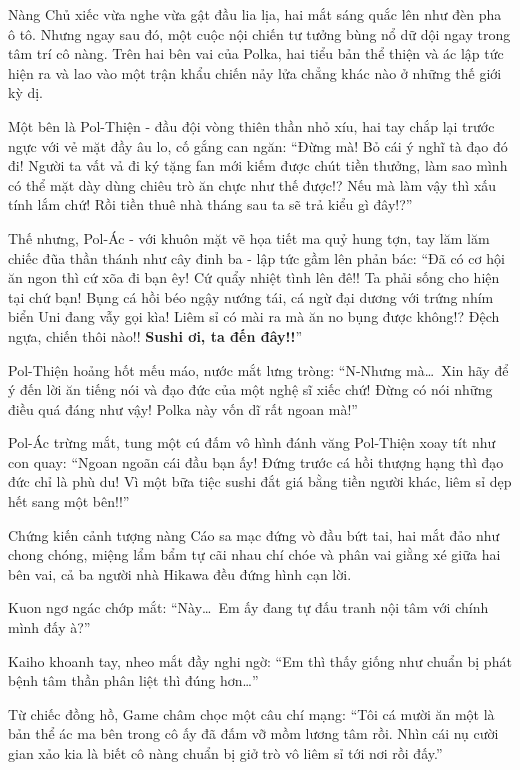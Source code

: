 \documentclass[../main.tex]{subfiles}
\begin{document}
Nàng Chủ xiếc vừa nghe vừa gật đầu lia lịa, hai mắt sáng quắc lên như đèn pha ô tô. Nhưng ngay sau đó, một cuộc nội chiến tư tưởng bùng nổ dữ dội ngay trong tâm trí cô nàng. Trên hai bên vai của Polka, hai tiểu bản thể thiện và ác lập tức hiện ra và lao vào một trận khẩu chiến nảy lửa chẳng khác nào ở những thế giới kỳ dị.

Một bên là Pol-Thiện - đầu đội vòng thiên thần nhỏ xíu, hai tay chắp lại trước ngực với vẻ mặt đầy âu lo, cố gắng can ngăn: ``Đừng mà! Bỏ cái ý nghĩ tà đạo đó đi! Người ta vất vả đi ký tặng fan mới kiếm được chút tiền thưởng, làm sao mình có thể mặt dày dùng chiêu trò ăn chực như thế được!? Nếu mà làm vậy thì xấu tính lắm chứ! Rồi tiền thuê nhà tháng sau ta sẽ trả kiểu gì đây!?''

Thế nhưng, Pol-Ác - với khuôn mặt vẽ họa tiết ma quỷ hung tợn, tay lăm lăm chiếc đũa thần thánh như cây đinh ba - lập tức gầm lên phản bác: ``Đã có cơ hội ăn ngon thì cứ xõa đi bạn êy! Cứ quẩy nhiệt tình lên đê!! Ta phải sống cho hiện tại chứ bạn! Bụng cá hồi béo ngậy nướng tái, cá ngừ đại dương với trứng nhím biển Uni đang vẫy gọi kìa! Liêm sỉ có mài ra mà ăn no bụng được không!? Đệch ngựa, chiến thôi nào!! \textbf{Sushi ơi, ta đến đây!!}''

Pol-Thiện hoảng hốt mếu máo, nước mắt lưng tròng: ``N-Nhưng mà\dots\ Xin hãy để ý đến lời ăn tiếng nói và đạo đức của một nghệ sĩ xiếc chứ! Đừng có nói những điều quá đáng như vậy! Polka này vốn dĩ rất ngoan mà!''

Pol-Ác trừng mắt, tung một cú đấm vô hình đánh văng Pol-Thiện xoay tít như con quay: ``Ngoan ngoãn cái đầu bạn ấy! Đứng trước cá hồi thượng hạng thì đạo đức chỉ là phù du! Vì một bữa tiệc sushi đắt giá bằng tiền người khác, liêm sỉ dẹp hết sang một bên!!''

Chứng kiến cảnh tượng nàng Cáo sa mạc đứng vò đầu bứt tai, hai mắt đảo như chong chóng, miệng lẩm bẩm tự cãi nhau chí chóe và phân vai giằng xé giữa hai bên vai, cả ba người nhà Hikawa đều đứng hình cạn lời.

Kuon ngơ ngác chớp mắt: ``Này\dots\ Em ấy đang tự đấu tranh nội tâm với chính mình đấy à?''

Kaiho khoanh tay, nheo mắt đầy nghi ngờ: ``Em thì thấy giống như chuẩn bị phát bệnh tâm thần phân liệt thì đúng hơn\dots''

Từ chiếc đồng hồ, Game châm chọc một câu chí mạng: ``Tôi cá mười ăn một là bản thể ác ma bên trong cô ấy đã đấm vỡ mồm lương tâm rồi. Nhìn cái nụ cười gian xảo kia là biết cô nàng chuẩn bị giở trò vô liêm sỉ tới nơi rồi đấy.''
\end{document}
